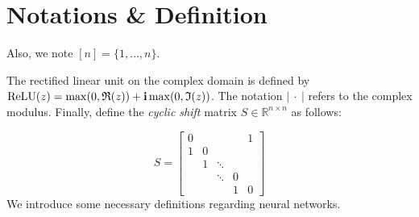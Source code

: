 \section{Notations \& Definition}




Also, we note $[n]=\{1,\ldots , n\}$.

The rectified linear unit on the complex domain is defined by $\relu(z)=\max\left(0,\mathfrak{R}(z)\right)+\ci\max\left(0,\mathfrak{I}(z)\right)$. The notation $\left|\ \cdot\ \right|$ refers to the complex modulus.
Finally, define the \emph{cyclic shift }matrix $S \in \mathbb{R}^{n\times n}$ as follows: 

\begin{equation}
  S = \left[ \begin{array}{ccccc}
  0 &  &  &  & 1 \\
  1 & 0 \\
   & 1 & \ddots \\
   &  & \ddots & 0 \\
   &  &  & 1 & 0
  \end{array}\right]
\end{equation}
We introduce some necessary definitions regarding neural networks.  



